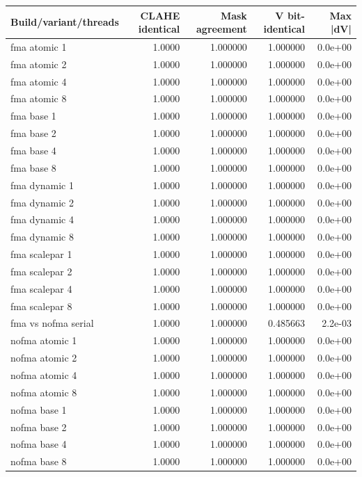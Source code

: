 \begin{tabular}{lrrrr}
\toprule
Build/variant/threads & CLAHE identical & Mask agreement & V bit-identical & Max |dV| \\
\midrule
fma atomic 1 & 1.0000 & 1.000000 & 1.000000 & 0.0e+00 \\
fma atomic 2 & 1.0000 & 1.000000 & 1.000000 & 0.0e+00 \\
fma atomic 4 & 1.0000 & 1.000000 & 1.000000 & 0.0e+00 \\
fma atomic 8 & 1.0000 & 1.000000 & 1.000000 & 0.0e+00 \\
fma base 1 & 1.0000 & 1.000000 & 1.000000 & 0.0e+00 \\
fma base 2 & 1.0000 & 1.000000 & 1.000000 & 0.0e+00 \\
fma base 4 & 1.0000 & 1.000000 & 1.000000 & 0.0e+00 \\
fma base 8 & 1.0000 & 1.000000 & 1.000000 & 0.0e+00 \\
fma dynamic 1 & 1.0000 & 1.000000 & 1.000000 & 0.0e+00 \\
fma dynamic 2 & 1.0000 & 1.000000 & 1.000000 & 0.0e+00 \\
fma dynamic 4 & 1.0000 & 1.000000 & 1.000000 & 0.0e+00 \\
fma dynamic 8 & 1.0000 & 1.000000 & 1.000000 & 0.0e+00 \\
fma scalepar 1 & 1.0000 & 1.000000 & 1.000000 & 0.0e+00 \\
fma scalepar 2 & 1.0000 & 1.000000 & 1.000000 & 0.0e+00 \\
fma scalepar 4 & 1.0000 & 1.000000 & 1.000000 & 0.0e+00 \\
fma scalepar 8 & 1.0000 & 1.000000 & 1.000000 & 0.0e+00 \\
fma vs nofma serial & 1.0000 & 1.000000 & 0.485663 & 2.2e-03 \\
nofma atomic 1 & 1.0000 & 1.000000 & 1.000000 & 0.0e+00 \\
nofma atomic 2 & 1.0000 & 1.000000 & 1.000000 & 0.0e+00 \\
nofma atomic 4 & 1.0000 & 1.000000 & 1.000000 & 0.0e+00 \\
nofma atomic 8 & 1.0000 & 1.000000 & 1.000000 & 0.0e+00 \\
nofma base 1 & 1.0000 & 1.000000 & 1.000000 & 0.0e+00 \\
nofma base 2 & 1.0000 & 1.000000 & 1.000000 & 0.0e+00 \\
nofma base 4 & 1.0000 & 1.000000 & 1.000000 & 0.0e+00 \\
nofma base 8 & 1.0000 & 1.000000 & 1.000000 & 0.0e+00 \\

\end{tabular}
